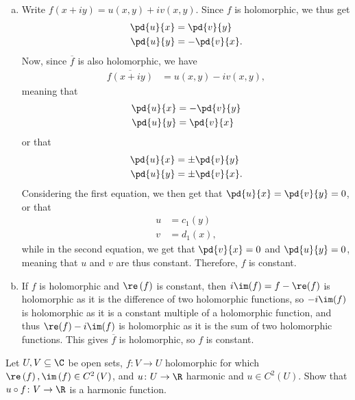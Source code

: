 \documentclass[10pt]{mypackage}
\begin{document}
\begin{solution}\hfill
  \begin{enumerate}[(a)]
    \item Write $f\left( x + iy \right) = u\left( x,y \right) + i v\left( x,y \right)$. Since $f$ is holomorphic, we thus get
      \begin{align*}
        \pd{u}{x} &= \pd{v}{y}\\
        \pd{u}{y} &= - \pd{v}{x}.
      \end{align*}
      Now, since $ \overline{f} $ is also holomorphic, we have
      \begin{align*}
        \overline{f\left( x + iy \right)} &= u\left( x,y \right) - i v\left( x,y \right),
      \end{align*}
      meaning that
      \begin{align*}
        \pd{u}{x} &= - \pd{v}{y}\\
        \pd{u}{y} &= \pd{v}{x}
      \end{align*}
      or that
      \begin{align*}
        \pd{u}{x} &= \pm \pd{v}{y}\\
        \pd{u}{y} &= \pm \pd{v}{x}.
      \end{align*}
      Considering the first equation, we then get that $ \pd{u}{x} = \pd{v}{y} = 0 $, or that
      \begin{align*}
        u &= c_1(y)\\
        v &= d_1(x),
      \end{align*}
      while in the second equation, we get that $ \pd{v}{x} = 0 $ and $ \pd{u}{y} = 0 $, meaning that $u$ and $v$ are thus constant. Therefore, $f$ is constant.
    \item If $f$ is holomorphic and $\re\left( f \right)$ is constant, then $i \im(f) = f-\re(f)$ is holomorphic as it is the difference of two holomorphic functions, so $-i\im(f)$ is holomorphic as it is a constant multiple of a holomorphic function, and thus $ \re(f) - i\im(f) $ is holomorphic as it is the sum of two holomorphic functions. This gives $ \overline{f} $ is holomorphic, so $f$ is constant.
  \end{enumerate}
\end{solution}
\begin{problem}[Problem 3]
  Let $U,V\subseteq \C$ be open sets, $f\colon V\rightarrow U$ holomorphic for which $\re\left( f \right),\im\left( f \right)\in C^2\left( V \right)$, and $u\colon U\rightarrow \R$ harmonic and $u\in C^{2}\left( U \right)$. Show that $u\circ f\colon V\rightarrow \R$ is a harmonic function.
\end{problem}
\end{document}
